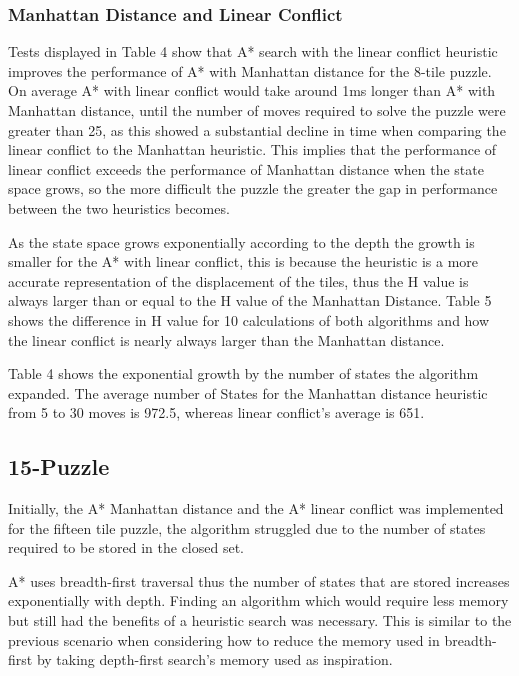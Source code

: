 \documentclass[final]{cmpreport}
\begin{document}
\subsubsection{Manhattan Distance and Linear Conflict}
Tests displayed in Table 4 show that A* search with the linear conflict heuristic improves the performance of A* with Manhattan distance for the 8-tile puzzle. On average A* with linear conflict would take around 1ms longer than A* with Manhattan distance, until the number of moves required to solve the puzzle were greater than 25, as this showed a substantial decline in time when comparing the linear conflict to the Manhattan heuristic. This implies that the performance of linear conflict exceeds the performance of Manhattan distance when the state space grows, so the more difficult the puzzle the greater the gap in performance between the two heuristics becomes.

As the state space grows exponentially according to the depth the growth is smaller for the A* with linear conflict, this is because the heuristic is a more accurate representation of the displacement of the tiles, thus the H value is always larger than or equal to the H value of the Manhattan Distance. Table 5 shows the difference in H value for 10 calculations of both algorithms and how the linear conflict is nearly always larger than the Manhattan distance.

Table 4 shows the exponential growth by the number of states the algorithm expanded. The average number of States for the Manhattan distance heuristic from 5 to 30 moves is 972.5, whereas linear conflict's average is 651.




\subsection{15-Puzzle}

Initially, the A* Manhattan distance and the A* linear conflict  was implemented for the fifteen tile puzzle, the algorithm struggled due to the number of states required to be stored in the closed set. 

A* uses breadth-first traversal thus the number of states that are stored increases exponentially with depth. Finding an algorithm which would require less memory but still had the benefits of a heuristic search was necessary. This is similar to the previous scenario when considering how to reduce the memory used in breadth-first by taking depth-first search's memory used as inspiration.
\end{document}
